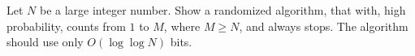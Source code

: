 \begin{exercise}
    Let $N$ be a large integer number. Show a randomized algorithm,
    that with, high probability, counts from $1$ to $M$, where
    $M \geq N$, and always stops. The algorithm should use only
    $O( \log \log N)$ bits.
\end{exercise}
   



\ChapterEnd{}
 

